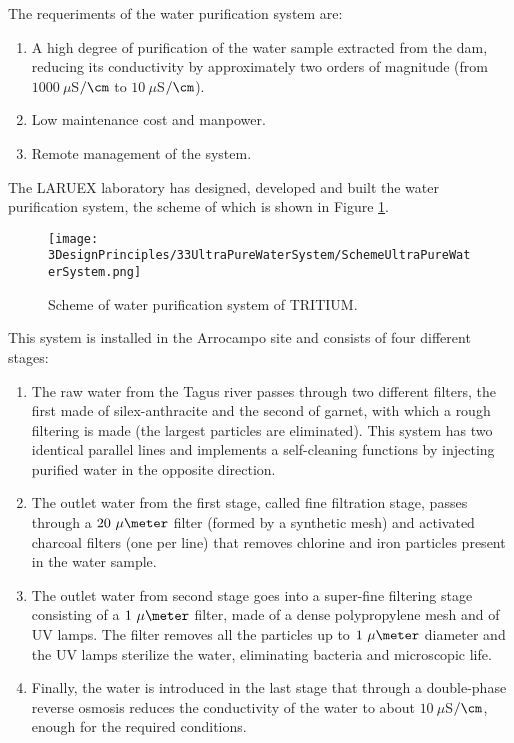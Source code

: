 The requeriments of the water purification system are:

\begin{enumerate}

\item{} A high degree of purification of the water sample extracted from the dam, reducing its conductivity by approximately two orders of magnitude (from $1000~\mu$S$/\cm$ to $10~\mu$S$/\cm$).

\item{} Low maintenance cost  and manpower.

\item{} Remote management of the system.
\end{enumerate}

The LARUEX laboratory has designed, developed and built the water purification system, the scheme of which is shown in Figure \ref{fig:WPSScheme}.

\begin{figure}[htbp]
\centering
\texttt{[image: 3DesignPrinciples/33UltraPureWaterSystem/SchemeUltraPureWaterSystem.png]}
\caption{Scheme of water purification system of TRITIUM.\label{fig:WPSScheme}}
\end{figure}
This system is installed in the Arrocampo site and consists of four different stages:

\begin{enumerate}
\item{} The raw water from the Tagus river passes through two different filters, the first made of silex-anthracite and the second of garnet, with which a rough filtering is made (the largest particles are eliminated). This system has two identical parallel lines and implements a self-cleaning functions by injecting purified water in the opposite direction.

\item{} The outlet water from the first stage, called fine filtration stage, passes through a $20~\mu\meter$ filter (formed by a synthetic mesh) and activated charcoal filters (one per line) that removes chlorine and iron particles present in the water sample.

\item{} The outlet water from second stage goes into a super-fine filtering stage consisting of a $1~\mu\meter$ filter, made of a dense polypropylene mesh and of UV lamps. The filter removes all the particles up to $1~\mu\meter$ diameter and the UV lamps sterilize the water, eliminating bacteria and microscopic life.

\item{} Finally, the water is introduced in the last stage that through a double-phase reverse osmosis reduces the conductivity of the water to about $10~\mu$S$/\cm$, enough for the required conditions. 

\end{enumerate}

